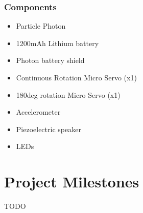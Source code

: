 \documentclass{sigchi-ext}
\begin{document}
\subsubsection{Components}

\begin{itemize}
  \item Particle Photon
  \item 1200mAh Lithium battery
  \item Photon battery shield
  \item Continuous Rotation Micro Servo (x1)
  \item 180deg rotation Micro Servo (x1)
  \item Accelerometer
  \item Piezoelectric speaker
  \item LEDs
\end{itemize}

\section{Project Milestones}
TODO


\end{document}
